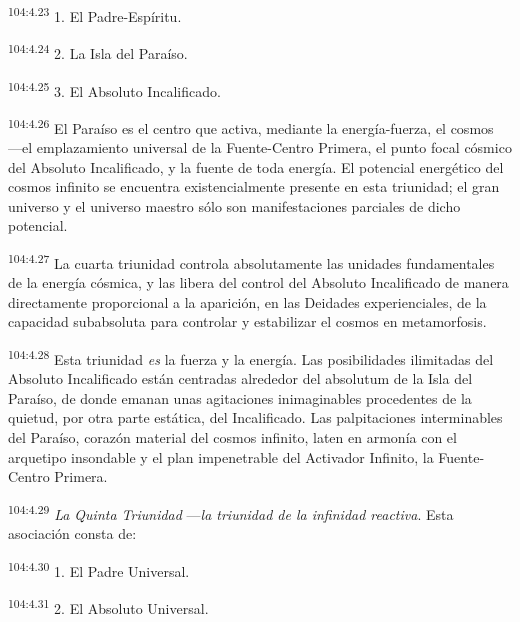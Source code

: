 \par
\textsuperscript{104:4.23} 1. El Padre-Espíritu.

\par
\textsuperscript{104:4.24} 2. La Isla del Paraíso.

\par
\textsuperscript{104:4.25} 3. El Absoluto Incalificado.

\par
\textsuperscript{104:4.26} El Paraíso es el centro que activa, mediante la energía-fuerza, el cosmos ---el emplazamiento universal de la Fuente-Centro Primera, el punto focal cósmico del Absoluto Incalificado, y la fuente de toda energía. El potencial energético del cosmos infinito se encuentra existencialmente presente en esta triunidad; el gran universo y el universo maestro sólo son manifestaciones parciales de dicho potencial.

\par
\textsuperscript{104:4.27} La cuarta triunidad controla absolutamente las unidades fundamentales de la energía cósmica, y las libera del control del Absoluto Incalificado de manera directamente proporcional a la aparición, en las Deidades experienciales, de la capacidad subabsoluta para controlar y estabilizar el cosmos en metamorfosis.

\par
\textsuperscript{104:4.28} Esta triunidad \textit{es} la fuerza y la energía. Las posibilidades ilimitadas del Absoluto Incalificado están centradas alrededor del absolutum de la Isla del Paraíso, de donde emanan unas agitaciones inimaginables procedentes de la quietud, por otra parte estática, del Incalificado. Las palpitaciones interminables del Paraíso, corazón material del cosmos infinito, laten en armonía con el arquetipo insondable y el plan impenetrable del Activador Infinito, la Fuente-Centro Primera.

\par
\textsuperscript{104:4.29} \textit{La Quinta Triunidad} ---\textit{la triunidad de la infinidad reactiva}. Esta asociación consta de:

\par
\textsuperscript{104:4.30} 1. El Padre Universal.

\par
\textsuperscript{104:4.31} 2. El Absoluto Universal.

